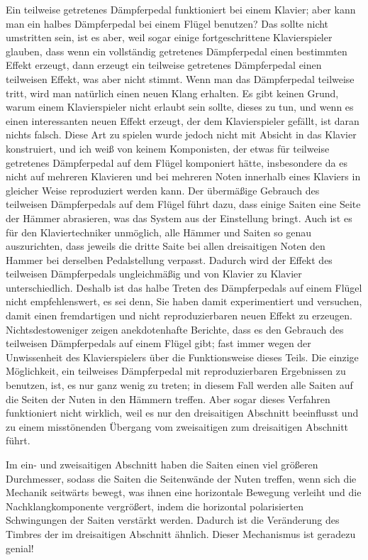 Ein teilweise getretenes Dämpferpedal funktioniert bei einem Klavier; aber kann man ein halbes Dämpferpedal bei einem Flügel benutzen?
Das sollte nicht umstritten sein, ist es aber, weil sogar einige fortgeschrittene Klavierspieler glauben, dass wenn ein vollständig getretenes Dämpferpedal einen bestimmten Effekt erzeugt, dann erzeugt ein teilweise getretenes Dämpferpedal einen teilweisen Effekt, was aber nicht stimmt.
Wenn man das Dämpferpedal teilweise tritt, wird man natürlich einen neuen Klang erhalten.
Es gibt keinen Grund, warum einem Klavierspieler nicht erlaubt sein sollte, dieses zu tun, und wenn es einen interessanten neuen Effekt erzeugt, der dem Klavierspieler gefällt, ist daran nichts falsch.
Diese Art zu spielen wurde jedoch nicht mit Absicht in das Klavier konstruiert, und ich weiß von keinem Komponisten, der etwas für teilweise getretenes Dämpferpedal auf dem Flügel komponiert hätte, insbesondere da es nicht auf mehreren Klavieren und bei mehreren Noten innerhalb eines Klaviers in gleicher Weise reproduziert werden kann.
Der übermäßige Gebrauch des teilweisen Dämpferpedals auf dem Flügel führt dazu, dass einige Saiten eine Seite der Hämmer abrasieren, was das System aus der Einstellung bringt.
Auch ist es für den Klaviertechniker unmöglich, alle Hämmer und Saiten so genau auszurichten, dass jeweils die dritte Saite bei allen dreisaitigen Noten den Hammer bei derselben Pedalstellung verpasst.
Dadurch wird der Effekt des teilweisen Dämpferpedals ungleichmäßig und von Klavier zu Klavier unterschiedlich.
Deshalb ist das halbe Treten des Dämpferpedals auf einem Flügel nicht empfehlenswert, es sei denn, Sie haben damit experimentiert und versuchen, damit einen fremdartigen und nicht reproduzierbaren neuen Effekt zu erzeugen.
Nichtsdestoweniger zeigen anekdotenhafte Berichte, dass es den Gebrauch des teilweisen Dämpferpedals auf einem Flügel gibt; fast immer wegen der Unwissenheit des Klavierspielers über die Funktionsweise dieses Teils.
Die einzige Möglichkeit, ein teilweises Dämpferpedal mit reproduzierbaren Ergebnissen zu benutzen, ist, es nur ganz wenig zu treten; in diesem Fall werden alle Saiten auf die Seiten der Nuten in den Hämmern treffen.
Aber sogar dieses Verfahren funktioniert nicht wirklich, weil es nur den dreisaitigen Abschnitt beeinflusst und zu einem misstönenden Übergang vom zweisaitigen zum dreisaitigen Abschnitt führt.

Im ein- und zweisaitigen Abschnitt haben die Saiten einen viel größeren Durchmesser, sodass die Saiten die Seitenwände der Nuten treffen, wenn sich die Mechanik seitwärts bewegt, was ihnen eine horizontale Bewegung verleiht und die Nachklangkomponente vergrößert, indem die horizontal polarisierten Schwingungen der Saiten verstärkt werden.
Dadurch ist die Veränderung des Timbres der im dreisaitigen Abschnitt ähnlich.
Dieser Mechanismus ist geradezu genial!

